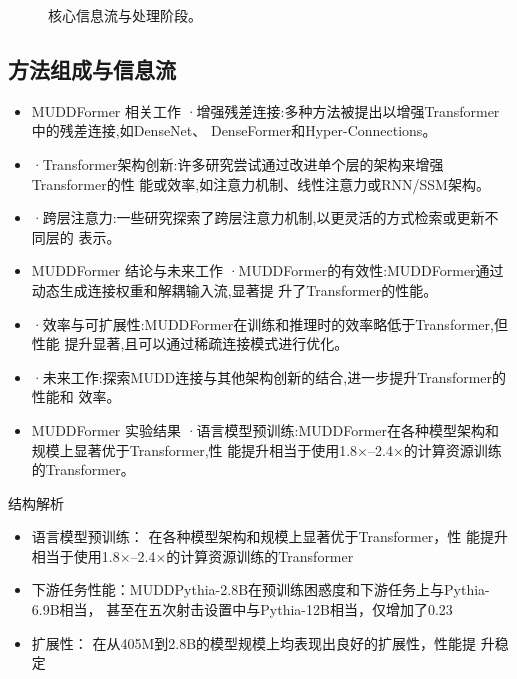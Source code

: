 \documentclass[UTF8,11pt,a4paper]{ctexart}
\begin{document}
\begin{figure}[H]
\centering
{}
\caption{核心信息流与处理阶段。}
\end{figure}

\subsection{方法组成与信息流}
\begin{itemize}
\item MUDDFormer 相关工作 ·增强残差连接:多种方法被提出以增强Transformer中的残差连接,如DenseNet、 DenseFormer和Hyper-Connections。
\item ·Transformer架构创新:许多研究尝试通过改进单个层的架构来增强Transformer的性 能或效率,如注意力机制、线性注意力或RNN/SSM架构。
\item ·跨层注意力:一些研究探索了跨层注意力机制,以更灵活的方式检索或更新不同层的 表示。
\item MUDDFormer 结论与未来工作 ·MUDDFormer的有效性:MUDDFormer通过动态生成连接权重和解耦输入流,显著提 升了Transformer的性能。
\item ·效率与可扩展性:MUDDFormer在训练和推理时的效率略低于Transformer,但性能 提升显著,且可以通过稀疏连接模式进行优化。
\item ·未来工作:探索MUDD连接与其他架构创新的结合,进一步提升Transformer的性能和 效率。
\item MUDDFormer 实验结果 ·语言模型预训练:MUDDFormer在各种模型架构和规模上显著优于Transformer,性 能提升相当于使用1.8×–2.4×的计算资源训练的Transformer。
\end{itemize}

\begin{keybox}{结构解析}
\begin{itemize}
\item 语言模型预训练： 在各种模型架构和规模上显著优于Transformer，性 能提升相当于使用1.8×–2.4×的计算资源训练的Transformer
\item 下游任务性能：MUDDPythia-2.8B在预训练困惑度和下游任务上与Pythia-6.9B相当， 甚至在五次射击设置中与Pythia-12B相当，仅增加了0.23\\%
\item 扩展性： 在从405M到2.8B的模型规模上均表现出良好的扩展性，性能提 升稳定
\end{itemize}
\end{keybox}
\end{document}
